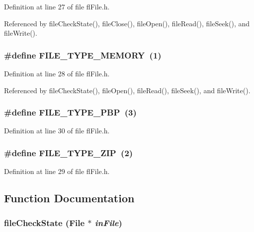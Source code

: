 Definition at line 27 of file fl\-File.h.

Referenced by file\-Check\-State(), file\-Close(), file\-Open(), file\-Read(), file\-Seek(), and file\-Write().
\subsubsection{\setlength{\rightskip}{0pt plus 5cm}\#define FILE\_\-TYPE\_\-MEMORY~(1)}\label{flFile_8h_e83b3f2eafce99a04213855010cdc1c2}




Definition at line 28 of file fl\-File.h.

Referenced by file\-Check\-State(), file\-Open(), file\-Read(), file\-Seek(), and file\-Write().
\subsubsection{\setlength{\rightskip}{0pt plus 5cm}\#define FILE\_\-TYPE\_\-PBP~(3)}\label{flFile_8h_2d0bc552dd1a51a23d60f3d129bbb40b}




Definition at line 30 of file fl\-File.h.
\subsubsection{\setlength{\rightskip}{0pt plus 5cm}\#define FILE\_\-TYPE\_\-ZIP~(2)}\label{flFile_8h_5aac195e570572b59b17a91da593cba0}




Definition at line 29 of file fl\-File.h.

\subsection{Function Documentation}
\subsubsection{ file\-Check\-State ({\bf File} $\ast$ {\em in\-File})}\label{flFile_8h_e4d685a401ce21554ebda7d01d4469e6}




